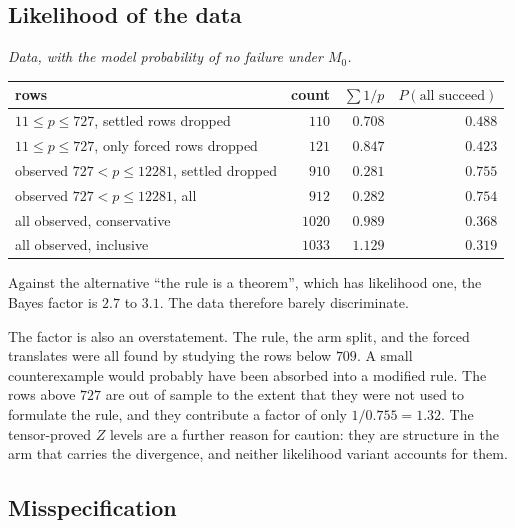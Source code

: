 \subsection{Likelihood of the data}\label{sec:model-likelihood}

\emph{Data, with the model probability of no failure under $M_0$.}
\begin{center}
\small
\begin{tabular}{lrrr}
\hline
rows & count & $\sum1/p$ & $P(\text{all succeed})$\\
\hline
$11\leq p\leq727$, settled rows dropped & $110$ & $0.708$ & $0.488$\\
$11\leq p\leq727$, only forced rows dropped & $121$ & $0.847$ & $0.423$\\
observed $727<p\leq12281$, settled dropped & $910$ & $0.281$ & $0.755$\\
observed $727<p\leq12281$, all & $912$ & $0.282$ & $0.754$\\
all observed, conservative & $1020$ & $0.989$ & $0.368$\\
all observed, inclusive & $1033$ & $1.129$ & $0.319$\\
\hline
\end{tabular}
\end{center}
Against the alternative ``the rule is a theorem'', which has likelihood one,
the Bayes factor is $2.7$ to $3.1$.  The data therefore barely discriminate.

The factor is also an overstatement.  The rule, the arm split, and the forced
translates were all found by studying the rows below $709$.  A small
counterexample would probably have been absorbed into a modified rule.  The
rows above $727$ are out of sample to the extent that they were not used to
formulate the rule, and they contribute a factor of only $1/0.755=1.32$.
The tensor-proved $Z$ levels are a further reason for caution: they are
structure in the arm that carries the divergence, and neither likelihood
variant accounts for them.

\subsection{Misspecification}\label{sec:model-misspec}

